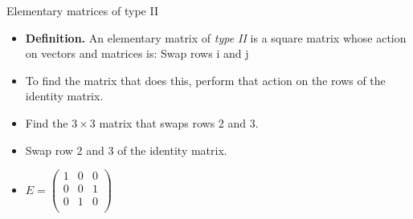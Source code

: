 \documentclass{beamer}
\begin{document}
\begin{frame}{Elementary matrices of type II}

\begin{itemize}
\item \textbf{Definition.} An elementary matrix of \emph{type II} is a square
matrix whose action on vectors and matrices is: Swap rows i and j
\item To find the matrix that does this, perform that action on the
rows of the identity matrix.
\item Find the $3\times 3$ matrix that swaps rows 2 and 3.
\item Swap row 2 and 3 of the identity matrix.
\item $
E = \begin{pmatrix}
1 & 0 & 0 \\
0 & 0 & 1 \\
0 & 1 & 0 \\
\end{pmatrix}
$
\end{itemize}
\end{frame}
\end{document}
